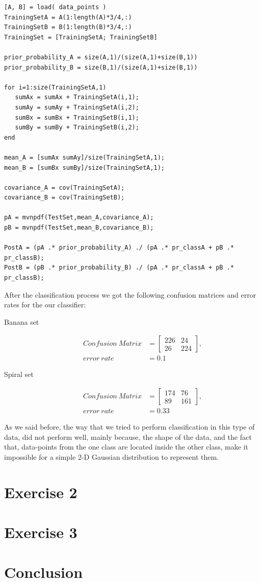 \documentclass[a4paper,11pt]{article}
\begin{document}
\begin{verbatim}
[A, B] = load( data_points )
TrainingSetA = A(1:length(A)*3/4,:)
TrainingSetB = B(1:length(B)*3/4,:)
TrainingSet = [TrainingSetA; TrainingSetB]

prior_probability_A = size(A,1)/(size(A,1)+size(B,1))
prior_probability_B = size(B,1)/(size(A,1)+size(B,1))

for i=1:size(TrainingSetA,1)
   sumAx = sumAx + TrainingSetA(i,1);
   sumAy = sumAy + TrainingSetA(i,2);
   sumBx = sumBx + TrainingSetB(i,1);
   sumBy = sumBy + TrainingSetB(i,2);
end

mean_A = [sumAx sumAy]/size(TrainingSetA,1);
mean_B = [sumBx sumBy]/size(TrainingSetA,1);

covariance_A = cov(TrainingSetA);
covariance_B = cov(TrainingSetB);

pA = mvnpdf(TestSet,mean_A,covariance_A);
pB = mvnpdf(TestSet,mean_B,covariance_B);

PostA = (pA .* prior_probability_A) ./ (pA .* pr_classA + pB .* pr_classB);
PostB = (pB .* prior_probability_B) ./ (pA .* pr_classA + pB .* pr_classB);
\end{verbatim} 
After the classification process we got the following confusion matrices and error rates for the our classifier:
\begin{description}
\item[Banana set]
\begin{align*}
Confusion\ Matrix &= 
\begin{bmatrix}
226 & 24 \\ 
26 & 224
\end{bmatrix},\\
error\ rate &= 0.1
\end{align*}
\item[Spiral set]
\begin{align*}
Confusion\ Matrix &= 
\begin{bmatrix}
174 & 76 \\ 
89 & 161
\end{bmatrix},\\
error\ rate &= 0.33
\end{align*}
\end{description}
As we said before, the way that we tried to perform classification in this type of data, did not perform well, mainly because, the shape of the data, and the fact that, data-points from the one class are located inside the other class, make it impossible for a simple 2-D Gaussian distribution to represent them.



\newpage

\section*{Exercise 2}

\newpage
\section*{Exercise 3}


\newpage
\section*{Conclusion}
\newpage
\end{document}
